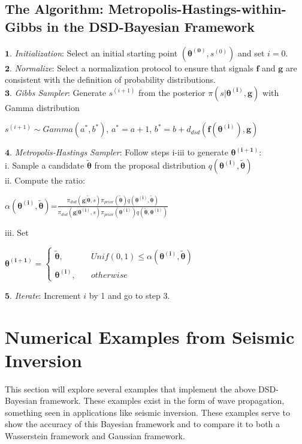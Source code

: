 \documentclass[botnum, fleqn]{unmeethesis}
\begin{document}
\section{\label{section:Metropolis-Hastings-within-Gibbs}The Algorithm: Metropolis-Hastings-within-Gibbs in the DSD-Bayesian Framework}
$\bm{1.}$ \emph{Initialization}: Select an initial starting point $(\bm{\theta^{(0)}},s^{(0)})$ and set $i=0$.\\
$\bm{2.}$ \emph{Normalize}: Select a normalization protocol  to ensure that signals $\bm{f}$ and $\bm{g}$ are consistent with the definition of probability distributions. \\
$\bm{3.}$ \emph{Gibbs Sampler}: Generate $s^{(i+1)}$ from the posterior $\pi(s|\bm{\theta^{(i)}},\bm{g})$ with Gamma distribution
\begin{center}
	$s^{(i+1)}\sim Gamma(a^*,b^*)$, \hspace{1cm} $a^*=a+1$, \hspace{1cm} $b^*=b+d_{dsd}(\bm{f}(\bm{\theta^{(i)}}),\bm{g})$
\end{center}
$\bm{4.}$ \emph{Metropolis-Hastings Sampler}: Follow steps i-iii to generate $\bm{\theta^{(i+1)}}$:\\
\indent\indent i. Sample a candidate $\widetilde{\bm{\theta}}$ from the proposal distribution $q(\bm{\theta^{(i)}},\widetilde{\bm{\theta}})$\\
\indent\indent ii. Compute the ratio:
\begin{center}
		$\alpha(\bm{\theta^{(i)}},\widetilde{\bm{\theta}})$=\Large$\frac{\pi_{dsd}(\bm{g}|\widetilde{\bm{\theta}},s)\pi_{prior}(\widetilde{\bm{\theta}})q(\bm{\theta^{(i)}},\widetilde{\bm{\theta}})} {\pi_{dsd}(\bm{g}|\bm{\theta^{(i)}},s)\pi_{prior}(\bm{\theta^{(i)}})q(\widetilde{\bm{\theta}},\bm{\theta^{(i)}})}$
\end{center}
\indent\indent\indent iii. Set
\begin{center}
	$\bm{\theta^{(i+1)}}=\left\{
	\begin{array}{ll}
		\widetilde{\bm{\theta}}, & \quad Unif(0,1) \leq \alpha(\bm{\theta^{(i)}},\widetilde{\bm{\theta}}) \\
		\bm{\theta^{(i)}}, & \quad otherwise
	\end{array}
	\right.$
\end{center}
$\bm{5.}$ \emph{Iterate}: Increment $i$ by 1 and go to step 3.


\chapter{Numerical Examples from Seismic Inversion}
This section will explore several examples that implement the above DSD-Bayesian framework. These examples exist in the form of wave propagation, something seen in applications like seismic inversion. These examples serve to show the accuracy of this Bayesian framework and to compare it to both a Wasserstein framework and Gaussian framework. 
\end{document}
